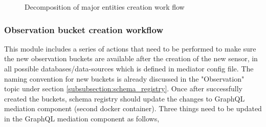 \begin{figure}[!htbp]
{		}
			\hfill
		\caption{Decomposition of major entities creation work flow}
		\label{fig:dummy}
	\end{figure}
	\newpage
	\subsubsection{Observation bucket creation workflow} \label{subsubsection:observation_bucket}
	This module includes a series of actions that need to be performed to make sure the new observation buckets are available after the creation of the new sensor, in all possible databases/data-sources which is defined in mediator config file. The naming convention for new buckets is already discussed in the "Observation" topic under section \ref{subsubsection:schema_registry}. Once after successfully created the buckets, schema registry should update the changes to GraphQL mediation component (second docker container). Three things need to be updated in the GraphQL mediation component as follows,
	
